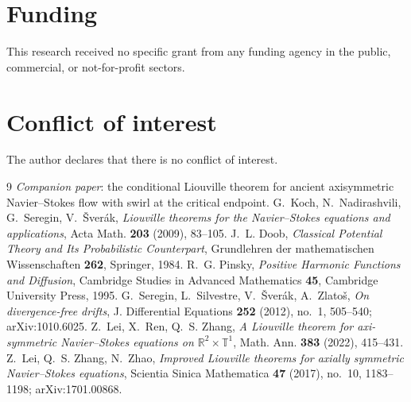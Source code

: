 \documentclass[11pt]{article}
\theoremstyle{definition}
\newcommand{\R}{\mathbb{R}}
\begin{document}
\section*{Funding}
This research received no specific grant from any funding agency in the
public, commercial, or not-for-profit sectors.

\section*{Conflict of interest}
The author declares that there is no conflict of interest.

\begin{thebibliography}{9}
\emph{Companion paper}: the conditional Liouville theorem for ancient
axisymmetric Navier--Stokes flow with swirl at the critical endpoint.
G.~Koch, N.~Nadirashvili, G.~Seregin, V.~\v{S}ver\'ak,
\emph{Liouville theorems for the Navier--Stokes equations and applications},
Acta Math. \textbf{203} (2009), 83--105.
J.~L. Doob, \emph{Classical Potential Theory and Its Probabilistic
Counterpart}, Grundlehren der mathematischen Wissenschaften \textbf{262},
Springer, 1984.
R.~G. Pinsky, \emph{Positive Harmonic Functions and Diffusion},
Cambridge Studies in Advanced Mathematics \textbf{45}, Cambridge University
Press, 1995.
G.~Seregin, L.~Silvestre, V.~\v{S}ver\'ak, A.~Zlato\v{s}, \emph{On
divergence-free drifts}, J. Differential Equations \textbf{252} (2012), no.~1,
505--540; arXiv:1010.6025.
Z.~Lei, X.~Ren, Q.~S. Zhang, \emph{A Liouville theorem for axi-symmetric
Navier--Stokes equations on $\R^2\times\mathbb{T}^1$}, Math. Ann.
\textbf{383} (2022), 415--431.
Z.~Lei, Q.~S. Zhang, N.~Zhao, \emph{Improved Liouville theorems for axially
symmetric Navier--Stokes equations}, Scientia Sinica Mathematica \textbf{47}
(2017), no.~10, 1183--1198; arXiv:1701.00868.
\end{thebibliography}
\end{document}
